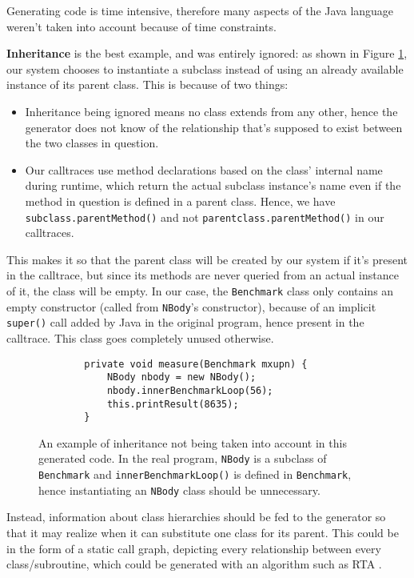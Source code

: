 \documentclass[12pt]{article}
\begin{document}
Generating code is time intensive, therefore many aspects of the Java language weren't taken into account because of time constraints. 

\textbf{Inheritance} is the best example, and was entirely ignored: as shown in Figure \ref{fig:inheritance}, our system chooses to instantiate a subclass instead of using an already available instance of its parent class. This is because of two things: 
\begin{itemize}
	\item Inheritance being ignored means no class extends from any other, hence the generator does not know of the relationship that's supposed to exist between the two classes in question.
	\item Our calltraces use method declarations based on the class' internal name during runtime, which return the actual subclass instance's name even if the method in question is defined in a parent class. Hence, we have \texttt{subclass.parentMethod()} and not \texttt{parentclass.parentMethod()} in our calltraces.
\end{itemize}

This makes it so that the parent class will be created by our system if it's present in the calltrace, but since its methods are never queried from an actual instance of it, the class will be empty. In our case, the \texttt{Benchmark} class only contains an empty constructor (called from \texttt{NBody}'s constructor), because of an implicit \texttt{super()} call added by Java in the original program, hence present in the calltrace. This class goes completely unused otherwise.

\begin{figure}[h!]
	\begin{lstlisting}
		private void measure(Benchmark mxupn) {
			NBody nbody = new NBody();
			nbody.innerBenchmarkLoop(56);
			this.printResult(8635);
		}
	\end{lstlisting}
	\captionsetup{justification=centering}
	\caption{An example of inheritance not being taken into account in this generated code. In the real program, \texttt{NBody} is a subclass of \texttt{Benchmark} and \texttt{innerBenchmarkLoop()} is defined in \texttt{Benchmark}, hence instantiating an \texttt{NBody} class should be unnecessary.}
	\label{fig:inheritance}
\end{figure}

Instead, information about class hierarchies should be fed to the generator so that it may realize when it can substitute one class for its parent. This could be in the form of a static call graph, depicting every relationship between every class/subroutine, which could be generated with an algorithm such as RTA \cite{call_graph_construction}.
\end{document}
